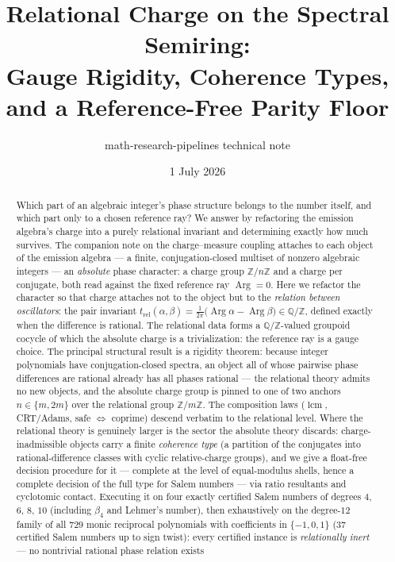\documentclass[11pt]{article}
\title{Relational Charge on the Spectral Semiring:\\
Gauge Rigidity, Coherence Types, and a Reference-Free Parity Floor}
\author{math-research-pipelines technical note}
\date{1 July 2026}
\theoremstyle{plain}
\theoremstyle{definition}
\theoremstyle{remark}
\newcommand{\Q}{\mathbb{Q}}
\newcommand{\Z}{\mathbb{Z}}
\DeclareMathOperator{\Arg}{Arg}
\DeclareMathOperator{\lcm}{lcm}
\newcommand{\tors}{\Q/\Z}
\begin{document}
\maketitle

\begin{abstract}
Which part of an algebraic integer's phase structure belongs to the number
itself, and which part only to a chosen reference ray? We answer by
refactoring the emission algebra's charge into a purely relational invariant
and determining exactly how much survives.
The companion note on the charge--measure coupling attaches to each object of the
emission algebra --- a finite, conjugation-closed multiset of nonzero algebraic
integers --- an \emph{absolute} phase character: a charge group $\Z/n\Z$ and a charge
per conjugate, both read against the fixed reference ray $\Arg=0$. Here we refactor
the character so that charge attaches not to the object but to the \emph{relation
between oscillators}: the pair invariant $t_{\mathrm{rel}}(\alpha,\beta)=
\frac{1}{2\pi}\bigl(\Arg\alpha-\Arg\beta\bigr)\in\tors$, defined exactly when the
difference is rational. The relational data forms a $\tors$-valued groupoid cocycle
of which the absolute charge is a trivialization: the reference ray is a
gauge choice. The principal structural result is a rigidity theorem: because
integer polynomials have conjugation-closed spectra, an object all of whose
pairwise phase differences are rational already has all phases rational --- the
relational theory admits no new objects, and the absolute charge group is pinned to
one of two anchors $n\in\{m,2m\}$ over the relational group $\Z/m\Z$. The
composition laws ($\lcm$, CRT/Adams, safe $\Leftrightarrow$ coprime) descend
verbatim to the relational level. Where the
relational theory is genuinely larger is the sector the absolute theory discards:
charge-inadmissible objects carry a finite \emph{coherence type} (a partition of
the conjugates into rational-difference classes with cyclic relative-charge
groups), and we give a float-free decision procedure for it --- complete at the
level of equal-modulus shells, hence a complete decision of the full type for
Salem numbers --- via ratio resultants and cyclotomic contact. Executing it on
four exactly certified Salem numbers of degrees $4$, $6$, $8$, $10$ (including
$\beta_4$ and Lehmer's number), then exhaustively on the degree-$12$ family of
all $729$ monic reciprocal polynomials with coefficients in $\{-1,0,1\}$
($37$ certified Salem numbers up to sign twist): every certified instance is
\emph{relationally inert} --- no nontrivial rational phase relation exists

\end{abstract}
\end{document}
